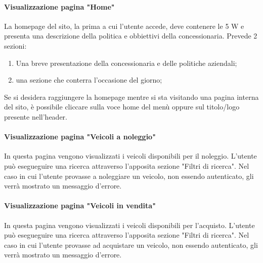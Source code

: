         \paragraph{Visualizzazione pagina "Home"}
        La homepage del sito, la prima a cui l'utente accede, deve contenere le 5 W e presenta una descrizione della politica e obbiettivi della concessionaria.
        Prevede 2 sezioni:
        \begin{enumerate}
            \item Una breve presentazione della concessionaria e delle politiche aziendali; 
            \item una sezione che conterra l'occasione del giorno;
            \end{enumerate}
        Se si desidera raggiungere la homepage mentre si sta visitando una pagina interna del sito, è possibile cliccare sulla voce home del menù oppure sul titolo/logo presente nell'header.

        \paragraph{Visualizzazione pagina "Veicoli a noleggio"}
        In questa pagina vengono visualizzati i veicoli disponibili per il noleggio. L'utente può esegueguire una ricerca attraverso l'apposita sezione "Filtri di ricerca". Nel caso in cui l'utente provasse a noleggiare un veicolo, non essendo autenticato, gli verrà mostrato un messaggio d'errore.

        \paragraph{Visualizzazione pagina "Veicoli in vendita"}
        In questa pagina vengono visualizzati i veicoli disponibili per l'acquisto. L'utente può esegueguire una ricerca attraverso l'apposita sezione "Filtri di ricerca". Nel caso in cui l'utente provasse ad acquistare un veicolo, non essendo autenticato, gli verrà mostrato un messaggio d'errore.

